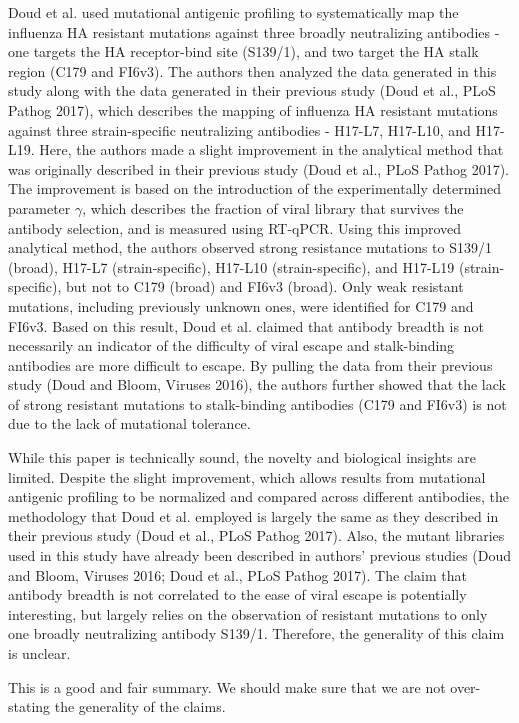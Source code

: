 \documentclass[11pt, oneside]{article}   	%
\begin{document}
Doud et al. used mutational antigenic profiling to systematically map the influenza HA resistant mutations against three broadly neutralizing antibodies - one targets the HA receptor-bind site (S139/1), and two target the HA stalk region (C179 and FI6v3). The authors then analyzed the data generated in this study along with the data generated in their previous study (Doud et al., PLoS Pathog 2017), which describes the mapping of influenza HA resistant mutations against three strain-specific neutralizing antibodies - H17-L7, H17-L10, and H17-L19. Here, the authors made a slight improvement in the analytical method that was originally described in their previous study (Doud et al., PLoS Pathog 2017). The improvement is based on the introduction of the experimentally determined parameter $\gamma$, which describes the fraction of viral library that survives the antibody selection, and is measured using RT-qPCR. Using this improved analytical method, the authors observed strong resistance mutations to S139/1 (broad), H17-L7 (strain-specific), H17-L10 (strain-specific), and H17-L19 (strain-specific), but not to C179 (broad) and FI6v3 (broad). Only weak resistant mutations, including previously unknown ones, were identified for C179 and FI6v3. Based on this result, Doud et al. claimed that antibody breadth is not necessarily an indicator of the difficulty of viral escape and stalk-binding antibodies are more difficult to escape. By pulling the data from their previous study (Doud and Bloom, Viruses 2016), the authors further showed that the lack of strong resistant mutations to stalk-binding antibodies (C179 and FI6v3) is not due to the lack of mutational tolerance.

While this paper is technically sound, the novelty and biological insights are limited. Despite the slight improvement, which allows results from mutational antigenic profiling to be normalized and compared across different antibodies, the methodology that Doud et al. employed is largely the same as they described in their previous study (Doud et al., PLoS Pathog 2017). Also, the mutant libraries used in this study have already been described in authors' previous studies (Doud and Bloom, Viruses 2016; Doud et al., PLoS Pathog 2017). The claim that antibody breadth is not correlated to the ease of viral escape is potentially interesting, but largely relies on the observation of resistant mutations to only one broadly neutralizing antibody S139/1. Therefore, the generality of this claim is unclear.

{\color{red} This is a good and fair summary.
We should make sure that we are not over-stating the generality of the claims.}
\end{document}
